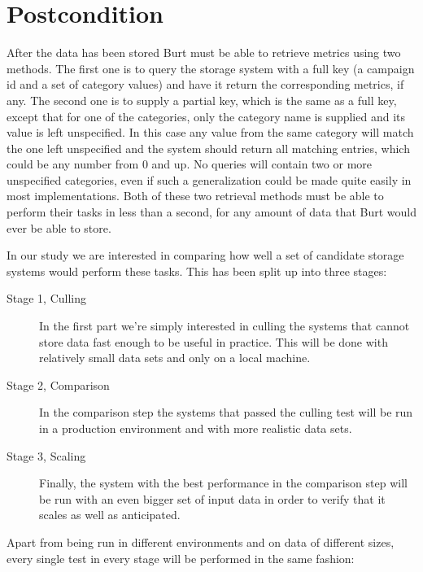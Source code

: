 \section{Postcondition} \label{sec:Postcondition}
After the data has been stored Burt must be able to retrieve metrics using two methods. The first one is to query the storage system with a full key (a campaign id and a set of category values) and have it return the corresponding metrics, if any. The second one is to supply a partial key, which is the same as a full key, except that for one of the categories, only the category name is supplied and its value is left unspecified. In this case any value from the same category will match the one left unspecified and the system should return all matching entries, which could be any number from 0 and up. No queries will contain two or more unspecified categories, even if such a generalization could be made quite easily in most implementations. Both of these two retrieval methods must be able to perform their tasks in less than a second, for any amount of data that Burt would ever be able to store.

In our study we are interested in comparing how well a set of candidate storage systems would perform these tasks. This has been split up into three stages:

\begin{description}
\item[Stage 1, Culling] In the first part we're simply interested in culling the systems that cannot store data fast enough to be useful in practice. This will be done with relatively small data sets and only on a local machine.
\item[Stage 2, Comparison] In the comparison step the systems that passed the culling test will be run in a production environment and with more realistic data sets.
\item[Stage 3, Scaling] Finally, the system with the best performance in the comparison step will be run with an even bigger set of input data in order to verify that it scales as well as anticipated.
\end{description}
Apart from being run in different environments and on data of different sizes, every single test in every stage will be performed in the same fashion:

